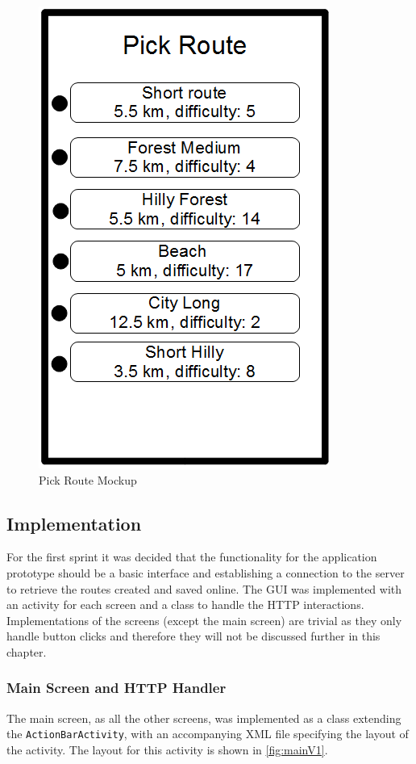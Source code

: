 \begin{figure}[!ht]
	\begin{center}
		\includegraphics[scale=0.4]{img/pickRouteMock.png}
		\caption{Pick Route Mockup}
		\label{fig:pickRouteMock}
	\end{center}
\end{figure}

\subsection{Implementation}
For the first sprint it was decided that the functionality for the application prototype should be a basic interface and establishing a connection to the server to retrieve the routes created and saved online. The \ac{GUI} was implemented with an activity for each screen and a class to handle the \ac{HTTP} interactions. Implementations of the screens (except the main screen) are trivial as they only handle button clicks and therefore they will not be discussed further in this chapter.

\subsubsection{Main Screen and HTTP Handler}
The main screen, as all the other screens, was implemented as a class extending the \texttt{ActionBarActivity}, with an accompanying \ac{XML} file specifying the layout of the activity. The layout for this activity is shown in \autoref{fig:mainV1}.

